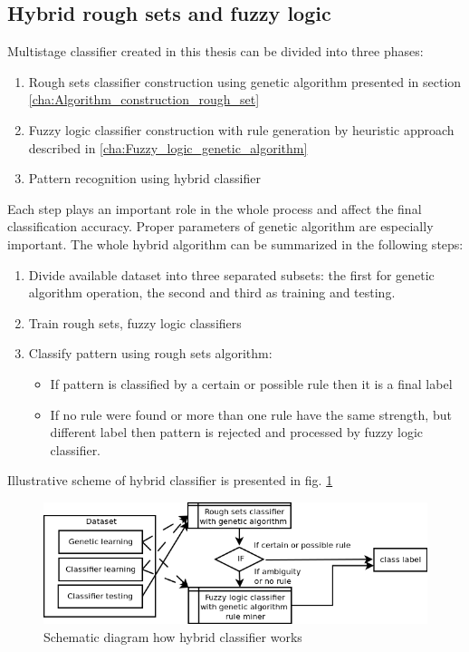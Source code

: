 \subsection{Hybrid rough sets and fuzzy logic}
\label{cha:Multistage_rough_fuzzy}
Multistage classifier created in this thesis can be divided into three phases:
\begin{enumerate}
    \item Rough sets classifier construction using genetic algorithm presented
        in section \ref{cha:Algorithm_construction_rough_set}
    \item Fuzzy logic classifier construction with rule generation by heuristic
        approach described in \ref{cha:Fuzzy_logic_genetic_algorithm}
    \item Pattern recognition using hybrid classifier 
\end{enumerate}
Each step plays an important role in the whole process and affect the final
classification accuracy. Proper parameters of genetic algorithm are especially
important. The whole hybrid algorithm can be summarized in the following steps:
\begin{enumerate}
    \item Divide available dataset into three separated subsets: the first for
        genetic algorithm operation, the second and third as training and
        testing.
    \item Train rough sets, fuzzy logic classifiers
    \item Classify pattern using rough sets algorithm:
        \begin{itemize}
            \item If pattern is classified by a certain or possible rule then
                it is a final label
            \item If no rule were found or more than one rule have the same
                strength, but different label then pattern is rejected and
                processed by fuzzy logic classifier.
        \end{itemize}
\end{enumerate}
Illustrative scheme of hybrid classifier is presented in fig.
\ref{fig:schematic}
\begin{figure}[H]
    \begin{center}
        \includegraphics[width=\textwidth]{fig/diagram.png}
    \end{center}
    \caption{Schematic diagram how hybrid classifier works}
    \label{fig:schematic}
\end{figure}
